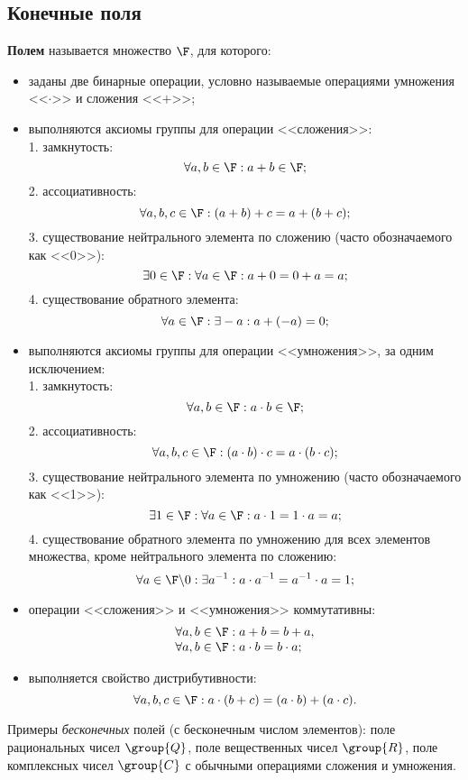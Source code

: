 \subsection{Конечные поля}

\textbf{Полем} называется множество $\F$, для которого:
\begin{itemize}
    \item заданы две бинарные операции, условно называемые операциями умножения <<$\cdot$>> и сложения <<$+$>>;
    \item выполняются аксиомы группы для операции <<сложения>>: \\
        1. замкнутость:
		\[\forall a, b \in \F: a + b \in \F;\]
        2. ассоциативность:
		\[\forall a, b, c \in \F: (a+b)+c = a+(b+c);\]
        3. существование нейтрального элемента по сложению (часто обозначаемого как <<0>>):
		\[\exists 0 \in \F: \forall a \in \F: a + 0 = 0 + a = a; \]
        4. существование обратного элемента:
		\[\forall a \in \F: \exists -a: a + (-a) = 0; \]
    \item выполняются аксиомы группы для операции <<умножения>>, за одним исключением: \\
        1. замкнутость:
		\[\forall a, b \in \F: a \cdot b \in \F; \]
        2. ассоциативность:
		\[\forall a, b, c \in \F: (a \cdot b) \cdot c = a \cdot (b \cdot c);\]
        3. существование нейтрального элемента по умножению (часто обозначаемого как <<1>>):
		\[\exists 1 \in \F: \forall a \in \F: a \cdot 1 = 1 \cdot a = a;\]
        4. существование обратного элемента по умножению для всех элементов множества, кроме нейтрального элемента по сложению:
		\[\forall a \in {\F \backslash 0}: \exists a^{-1}: a \cdot a^{-1} = a^{-1} \cdot a = 1;\]
    \item операции <<сложения>> и <<умножения>> коммутативны: \\
        \[ \begin{array}{l}
            \forall a, b \in \F: a + b = b + a, \\
            \forall a, b \in \F: a \cdot b = b \cdot a; \\
        \end{array} \]
    \item выполняется свойство дистрибутивности:
        \[ \forall a, b, c \in \F: a \cdot (b + c) = (a \cdot b) + (a \cdot c). \]
\end{itemize}

Примеры \emph{бесконечных} полей (с бесконечным числом элементов): поле рациональных чисел $\group{Q}$, поле вещественных чисел $\group{R}$, поле комплексных чисел $\group{C}$ с обычными операциями сложения и умножения.

